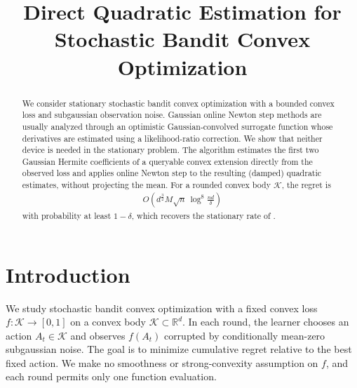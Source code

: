 \documentclass[12pt,cleveref]{jmlr}
\title[Direct Quadratic Estimation for Bandit Convex Optimization]
{Direct Quadratic Estimation for Stochastic Bandit Convex Optimization}
\author{}
\newcommand{\R}{\mathbb R}
\newcommand{\K}{\mathcal K}
\newcommand{\1}{\mathbf 1}
\begin{document}
\maketitle

\begin{abstract}
    We consider stationary stochastic bandit convex optimization with a bounded
    convex loss and subgaussian observation noise.  Gaussian online Newton step
    methods are usually analyzed through an optimistic Gaussian-convolved surrogate function whose
    derivatives are estimated using a likelihood-ratio correction.  We show that
    neither device is needed in the stationary problem.  The algorithm estimates
    the first two Gaussian Hermite coefficients of a queryable convex extension
    directly from the observed loss and applies online Newton step to the resulting
    (damped) quadratic estimates, without projecting the mean.
    For a rounded convex body $\K$, the regret is
    \begin{align}
        O\!\left(d^{\frac{3}{2}} M\sqrt n\,
        \log^8\!\frac{nd}{\delta}\right)
    \end{align}
    with probability at least $1-\delta$,
    which recovers the stationary rate of \citet{fokkema2024online}.
\end{abstract}

\section{Introduction}
\label{sec:introduction}
We study stochastic bandit convex optimization with a fixed convex loss
$f:\K\to[0,1]$ on a convex body $\K\subset\R^d$. In each round, the learner
chooses an action $A_t\in\K$ and observes $f(A_t)$ corrupted by conditionally
mean-zero subgaussian noise. The goal is to minimize cumulative regret
relative to the best fixed action. We make no smoothness or strong-convexity
assumption on $f$, and each round permits only one function evaluation.
\end{document}
